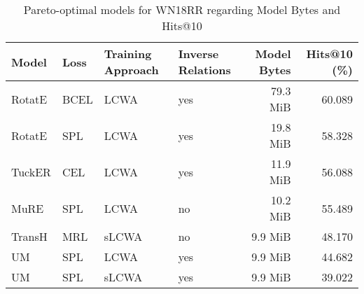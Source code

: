 \begin{table}[H]
\centering
\caption{Pareto-optimal models for WN18RR regarding Model Bytes and Hits@10}
\label{tab:skyline_wn18rr_model_bytes}
\begin{tabular}{llllrr}
\toprule
 Model & Loss & Training Approach & Inverse Relations & Model Bytes &  Hits@10 (\%) \\
\midrule
RotatE & BCEL &              LCWA &               yes &    79.3 MiB &       60.089 \\
RotatE &  SPL &              LCWA &               yes &    19.8 MiB &       58.328 \\
TuckER &  CEL &              LCWA &               yes &    11.9 MiB &       56.088 \\
  MuRE &  SPL &              LCWA &                no &    10.2 MiB &       55.489 \\
TransH &  MRL &             sLCWA &                no &     9.9 MiB &       48.170 \\
    UM &  SPL &              LCWA &               yes &     9.9 MiB &       44.682 \\
    UM &  SPL &             sLCWA &               yes &     9.9 MiB &       39.022 \\
\bottomrule
\end{tabular}
\end{table}

